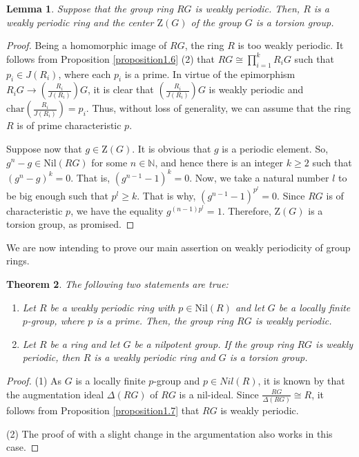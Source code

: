 \documentclass[12pt]{amsart}
\newtheorem{thm}{Theorem}[section]
\newtheorem{lem}[thm]{Lemma}
\theoremstyle{definition}
\theoremstyle{remark}
\numberwithin{equation}{section}
\begin{document}
\begin{lem}\label{lemma3.9}
Suppose that the group ring $RG$ is weakly periodic. Then, $R$ is a weakly periodic ring and the center $\mathrm{Z}(G)$ of the group $G$ is a torsion group.
\end{lem}

\begin{proof}
Being a homomorphic image of $RG$, the ring $R$ is too weakly periodic. It follows from Proposition \ref{proposition1.6} (2) that $RG \cong \prod_{i=1}^k R_iG$ such that $p_i \in J(R_i)$, where each $p_i$ is a prime. In virtue of the epimorphism $R_iG \rightarrow (\frac{R_i}{J(R_i)})G$, it is clear that $(\frac{R_i}{J(R_i)})G$ is weakly periodic and $\mathrm{char}(\frac{R_i}{J(R_i)})=p_i$. Thus, without loss of generality, we can assume that the ring $R$ is of prime characteristic $p$.

Suppose now that $g \in \mathrm{Z}(G)$. It is obvious that $g$ is a periodic element. So, $g^n-g \in \mathrm{Nil}(RG)$ for some $n \in \mathbb{N}$, and hence there is an integer $k \geq 2$ such that ${(g^n-g)}^k=0$. That is,  ${(g^{n-1}-1)}^k=0$. Now, we take a natural number $l$ to be big enough such that $p^l \geq k$. That is why, ${(g^{n-1}-1)}^{p^l}=0$. Since $RG$ is of characteristic $p$, we have the equality $g^{(n-1)p^l}=1$. Therefore, $\mathrm{Z}(G)$ is a torsion group, as promised.
\end{proof}

We are now intending to prove our main assertion on weakly periodicity of group rings.

\begin{thm}\label{theorem3.10}
The following two statements are true:
\begin{enumerate}
\item[\rm{(1)}]
Let $R$ be a weakly periodic ring with $p \in \mathrm{Nil}(R)$ and let $G$ be a locally finite $p$-group, where $p$ is a prime. Then, the group ring $RG$ is weakly periodic.
\item[\rm{(2)}]
Let $R$ be a ring and let $G$ be a nilpotent group. If the group ring $RG$ is weakly periodic, then $R$ is a weakly periodic ring and $G$ is a torsion group.
\end{enumerate}
\end{thm}

\begin{proof}
(1) As $G$ is a locally finite $p$-group and $p \in Nil(R)$, it is known by \cite[Proposition 16]{Connell} that the augmentation ideal $\Delta(RG)$ of $RG$ is a nil-ideal. Since $\frac{RG}{\Delta(RG)} \cong R$, it follows from Proposition \ref{proposition1.7} that $RG$ is weakly periodic.

(2) The proof of \cite[Theorem 5.2]{BMA} with a slight change in the argumentation also works in this case.
\end{proof}
\end{document}
